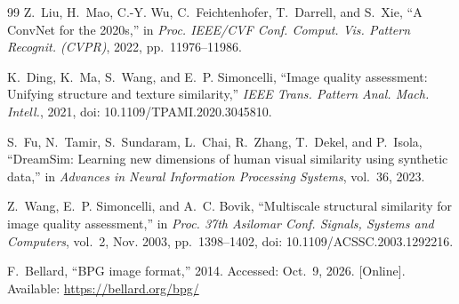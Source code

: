 \begin{thebibliography}{99}
Z.~Liu, H.~Mao, C.-Y. Wu, C.~Feichtenhofer, T.~Darrell, and S.~Xie, ``A ConvNet for the 2020s,'' in \emph{Proc. IEEE/CVF Conf. Comput. Vis. Pattern Recognit. (CVPR)}, 2022, pp.~11976--11986.

K.~Ding, K.~Ma, S.~Wang, and E.~P. Simoncelli, ``Image quality assessment: Unifying structure and texture similarity,'' \emph{IEEE Trans. Pattern Anal. Mach. Intell.}, 2021, doi: 10.1109/TPAMI.2020.3045810.

S.~Fu, N.~Tamir, S.~Sundaram, L.~Chai, R.~Zhang, T.~Dekel, and P.~Isola, ``DreamSim: Learning new dimensions of human visual similarity using synthetic data,'' in \emph{Advances in Neural Information Processing Systems}, vol.~36, 2023.

Z.~Wang, E.~P. Simoncelli, and A.~C. Bovik, ``Multiscale structural similarity for image quality assessment,'' in \emph{Proc. 37th Asilomar Conf. Signals, Systems and Computers}, vol.~2, Nov. 2003, pp.~1398--1402, doi: 10.1109/ACSSC.2003.1292216.

F.~Bellard, ``BPG image format,'' 2014. Accessed: Oct.~9, 2026. [Online]. Available: \url{https://bellard.org/bpg/}
\end{thebibliography}
